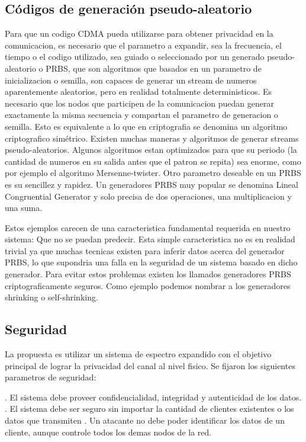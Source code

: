 \documentclass[a4paper,10pt]{report}
\begin{document}
\subsection{Códigos de generación pseudo-aleatorio}
Para que un codigo CDMA pueda utilizarse para obtener privacidad en la comunicacion, es necesario que el parametro a expandir, sea la frecuencia, el tiempo o el codigo utilizado, sea guiado o seleccionado por un generado pseudo-aleatorio o PRBS, que son algoritmos que basados en un parametro de inicializacion o semilla, son capaces de generar un stream de numeros aparentemente aleatorios, pero en realidad totalmente deterministicos. 
Es necesario que los nodos que participen de la comunicacion puedan generar exactamente la misma secuencia y compartan el parametro de generacion o semilla. Esto es equivalente a lo que en criptografia se denomina un algoritmo criptografico simétrico.
Existen muchas maneras y algoritmos de generar streams pseudo-aleatorios. Algunos algoritmos estan optimizados para que su periodo (la cantidad de numeros en su salida antes que el patron se repita) sea enorme, como por ejemplo el algoritmo Mersenne-twister.
Otro parametro deseable en un PRBS es su sencillez y rapidez. Un generadores PRBS muy popular se denomina Lineal Congruential Generator y solo precisa de dos operaciones, una multiplicacion y una suma.

Estos ejemplos carecen de una caracteristica fundamental requerida en nuestro sistema: Que no se puedan predecir. Esta simple caracteristica no es en realidad trivial ya que muchas tecnicas existen para inferir datos acerca del generador PRBS, lo que supondria una falla en la seguridad de un sistema basado en dicho generador. Para evitar estos problemas existen los llamados generadores PRBS criptograficamente seguros. Como ejemplo podemos nombrar a los generadores shrinking o self-shrinking.

\subsection{Seguridad}
La propuesta es utilizar un sistema de espectro expandido con el objetivo principal de lograr la privacidad del canal al nivel fisico.
Se fijaron los siguientes parametros de seguridad:

. El sistema debe proveer confidencialidad, integridad y autenticidad de los datos.
. El sistema debe ser seguro sin importar la cantidad de clientes existentes o los datos que transmiten
. Un atacante no debe poder identificar los datos de un cliente, aunque controle todos los demas nodos de la red.
\end{document}
